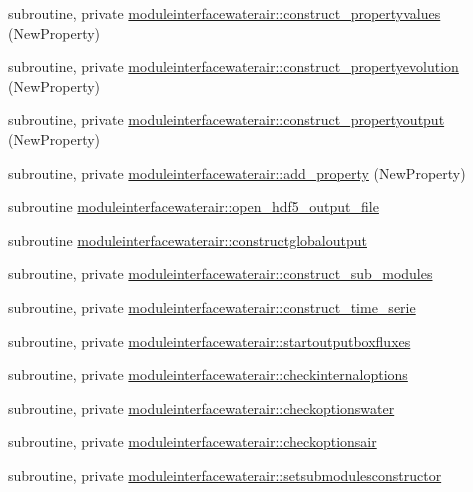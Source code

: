 \begin{DoxyCompactItemize}
\item 
subroutine, private \mbox{\hyperlink{namespacemoduleinterfacewaterair_a564ac080f485dff9d0cc2f92d398f795}{moduleinterfacewaterair\+::construct\+\_\+propertyvalues}} (New\+Property)
\item 
subroutine, private \mbox{\hyperlink{namespacemoduleinterfacewaterair_a49127aa503109a2b4f86aee6e0d4d665}{moduleinterfacewaterair\+::construct\+\_\+propertyevolution}} (New\+Property)
\item 
subroutine, private \mbox{\hyperlink{namespacemoduleinterfacewaterair_aa99a2e7fefb8e45ed29092e8c068982a}{moduleinterfacewaterair\+::construct\+\_\+propertyoutput}} (New\+Property)
\item 
subroutine, private \mbox{\hyperlink{namespacemoduleinterfacewaterair_a2a801625d49cd1732858f2dc52a71271}{moduleinterfacewaterair\+::add\+\_\+property}} (New\+Property)
\item 
subroutine \mbox{\hyperlink{namespacemoduleinterfacewaterair_a48080272c5d72deaf3fe655740d02ccc}{moduleinterfacewaterair\+::open\+\_\+hdf5\+\_\+output\+\_\+file}}
\item 
subroutine \mbox{\hyperlink{namespacemoduleinterfacewaterair_a1512570388fa7585da06c4fd36fc27ae}{moduleinterfacewaterair\+::constructglobaloutput}}
\item 
subroutine, private \mbox{\hyperlink{namespacemoduleinterfacewaterair_a26e91289c0b811bff694b61c7a06fb15}{moduleinterfacewaterair\+::construct\+\_\+sub\+\_\+modules}}
\item 
subroutine, private \mbox{\hyperlink{namespacemoduleinterfacewaterair_a49e85ee8a7b283a5ec88a2c8db419d3e}{moduleinterfacewaterair\+::construct\+\_\+time\+\_\+serie}}
\item 
subroutine, private \mbox{\hyperlink{namespacemoduleinterfacewaterair_a657983e875ad047622b576288b98dd2e}{moduleinterfacewaterair\+::startoutputboxfluxes}}
\item 
subroutine, private \mbox{\hyperlink{namespacemoduleinterfacewaterair_a7bb7aa6672e098e262e702265ea4cbef}{moduleinterfacewaterair\+::checkinternaloptions}}
\item 
subroutine, private \mbox{\hyperlink{namespacemoduleinterfacewaterair_a6ca031d04555d7ec7193b26144ed978f}{moduleinterfacewaterair\+::checkoptionswater}}
\item 
subroutine, private \mbox{\hyperlink{namespacemoduleinterfacewaterair_afa8defb4c07e4d9150f1507fc3ea475a}{moduleinterfacewaterair\+::checkoptionsair}}
\item 
subroutine, private \mbox{\hyperlink{namespacemoduleinterfacewaterair_acc8f2f52f650494e800b421332c39060}{moduleinterfacewaterair\+::setsubmodulesconstructor}}

\end{DoxyCompactItemize}
